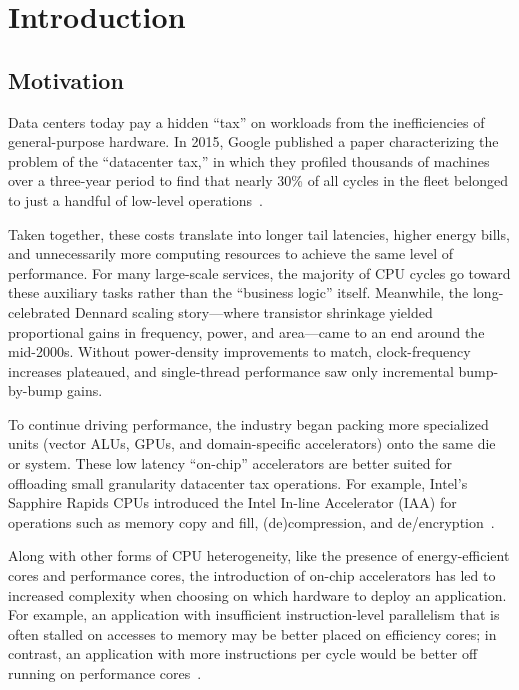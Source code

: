 \section{Introduction}

\subsection{Motivation}

Data centers today pay a hidden ``tax'' on workloads from the inefficiencies of general-purpose hardware.
In 2015, Google published a paper characterizing the problem of the ``datacenter tax,'' in which they profiled thousands of machines over a three-year period to find that nearly 30\% of all cycles in the fleet belonged to just a handful of low-level operations~\cite{kanev2015profiling}.



Taken together, these costs translate into longer tail latencies, higher energy bills, and unnecessarily more computing resources to achieve the same level of performance.
For many large-scale services, the majority of CPU cycles go toward these auxiliary tasks rather than the ``business logic'' itself.
Meanwhile, the long-celebrated Dennard scaling story---where transistor shrinkage yielded proportional gains in frequency, power, and area---came to an end around the mid-2000s. Without power-density improvements to match, clock-frequency increases plateaued, and single-thread performance saw only incremental bump-by-bump gains.

To continue driving performance, the industry began packing more specialized units (vector ALUs, GPUs, and domain-specific accelerators) onto the same die or system.
These low latency ``on-chip'' accelerators are better suited for offloading small granularity datacenter tax operations.
For example, Intel's Sapphire Rapids CPUs introduced the Intel In-line Accelerator (IAA) for operations such as memory copy and fill, (de)compression, and de/encryption~\cite{yuan2024intel}.

Along with other forms of CPU heterogeneity, like the presence of energy-efficient cores and performance cores, the introduction of on-chip accelerators has led to increased complexity when choosing on which hardware to deploy an application.
For example, an application with insufficient instruction-level parallelism that is often stalled on accesses to memory may be better placed on efficiency cores; in contrast, an application with more instructions per cycle would be better off running on performance cores~\cite{kanev2015profiling}.


